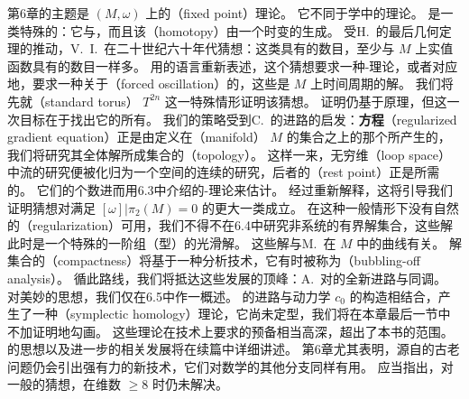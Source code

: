 第6章的主题是\trCompact\trSymplecticManifold{} $(M,\omega)$ 上\trHamiltonianMap{}的\textbf{\trFixedPoint}（fixed point）理论。
它不同于\trTopology{}学中的\trFixedPoint{}理论。
\trHamiltonianMap{}是一类特殊的\trSymplecticMapping：它与\trIdentityMap\trHomotopic{}，而且该\textbf{\trHomotopy}（homotopy）由一个时变\trHamiltonianVectorField{}的\trFlow{}生成。
受H.~\trPoincare{}的最后几何定理的推动，V.~I.~\trArnold{}在二十世纪六十年代猜想：这类\trHamiltonianMap{}具有\trFixedPoint{}的数目，至少与 $M$ 上实值函数具有\trCriticalPoint{}的数目一样多。
用\trDynamicalSystem{}的语言重新表述，这个猜想要求一种\trLjusternik-\trSchnirelman{}理论，或者对应地，要求一种关于\textbf{\trForcedOscillation}（forced oscillation）的\trMorseTheory{}，这些\trForcedOscillation{}是 $M$ 上时间周期\trHamiltonianSystem{}的解。
我们将先就\trStandard\trTorus{}（standard torus） $T^{2n}$ 这一特殊情形证明该猜想。
证明仍基于\trAction{}原理，但这一次目标在于找出它的所有\trCriticalPoint。
我们的策略受到C.~\trConley{}的\trDynamicalSystem{}\trTopology{}进路的启发：\textbf{\trRegularization\trGradient{}方程}（regularized gradient equation）正是由定义在\textbf{\trManifold}（manifold） $M$ 的\trContractible\trLoop{}集合之上的那个\trActionFunctional{}所产生的，我们将研究其全体\trBounded{}解所成集合的\textbf{\trTopology}（topology）。
这样一来，无穷维\textbf{\trLoopSpace}（loop space）中\trGradient{}流的研究便被化归为一个\trCompact\trMetric{}空间的\trGradientLike{}连续\trFlow{}的研究，后者的\textbf{\trRestPoint}（rest point）正是所需的\trCriticalPoint。
它们的个数进而用6.3中介绍的\trLjusternik-\trSchnirelman{}理论来估计。
经过重新解释，这将引导我们证明\trArnold{}猜想对满足 $[\omega]|\pi_2(M)=0$ 的更大一类\trSymplecticManifold{}成立。
在这种一般情形下没有自然的\textbf{\trRegularization}（regularization）可用，我们不得不在6.4中研究非\trRegularization\trGradient{}系统的有界解集合，这些解此时是一个特殊的一阶\trElliptic{}\trPartialDifferentialEquation{}组（\trCauchyRiemann{}型）的光滑解。
这些解与M.~\trGromov{}在 $M$ 中的\trPseudoholomorphic{}曲线有关。
解集合的\textbf{\trCompactness}（compactness）将基于一种分析技术，它有时被称为\textbf{\trBubblingOffAnalysis}（bubbling-off analysis）。
循此路线，我们将抵达这些发展的顶峰：A.~\trFloer{}对\trMorseTheory{}的全新进路与\trFloer{}同调。
对\trFloer{}美妙的思想，我们仅在6.5中作一概述。
\trFloer{}的进路与动力学\trCapacity{} $c_0$ 的构造相结合，产生了一种\textbf{\trSymplectic\trHomology}（symplectic homology）理论，它尚未定型，我们将在本章最后一节中不加证明地勾画。
这些理论在技术上要求的预备相当高深，超出了本书的范围。
\trFloer{}的思想以及进一步的相关发展将在续篇中详细讲述。
第6章尤其表明，源自\trCelestialMechanics{}的古老问题仍会引出强有力的新技术，它们对数学的其他分支同样有用。
应当指出，对一般\trSymplecticManifold{}的\trArnold{}猜想，在维数 $\geq 8$ 时仍未解决。

